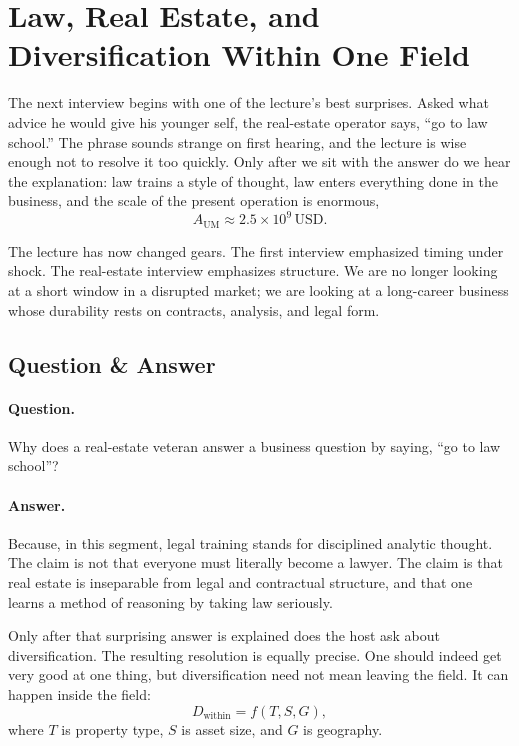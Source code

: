 \section{Law, Real Estate, and Diversification Within One Field}

The next interview begins with one of the lecture's best surprises. Asked what advice he would give his younger self, the real-estate operator says, ``go to law school.'' The phrase sounds strange on first hearing, and the lecture is wise enough not to resolve it too quickly. Only after we sit with the answer do we hear the explanation: law trains a style of thought, law enters everything done in the business, and the scale of the present operation is enormous,
\begin{equation}
A_{\mathrm{UM}} \approx 2.5\times 10^9 \,\mathrm{USD}.
\end{equation}

The lecture has now changed gears. The first interview emphasized timing under shock. The real-estate interview emphasizes structure. We are no longer looking at a short window in a disrupted market; we are looking at a long-career business whose durability rests on contracts, analysis, and legal form.

\subsection{Question \& Answer}

\paragraph{Question.} Why does a real-estate veteran answer a business question by saying, ``go to law school''?

\paragraph{Answer.} Because, in this segment, legal training stands for disciplined analytic thought. The claim is not that everyone must literally become a lawyer. The claim is that real estate is inseparable from legal and contractual structure, and that one learns a method of reasoning by taking law seriously.

Only after that surprising answer is explained does the host ask about diversification. The resulting resolution is equally precise. One should indeed get very good at one thing, but diversification need not mean leaving the field. It can happen inside the field:
\begin{equation}
D_{\mathrm{within}} = f(T,S,G),
\end{equation}
where \(T\) is property type, \(S\) is asset size, and \(G\) is geography.


